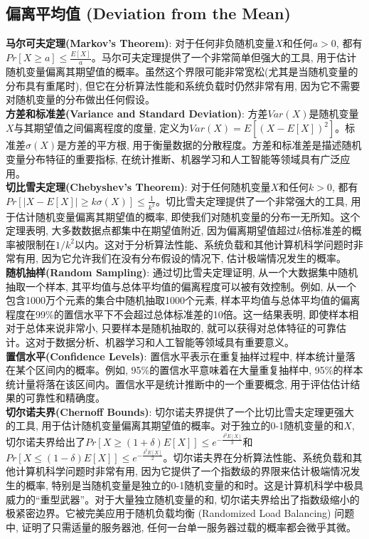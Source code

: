 \documentclass[12pt, a4paper, UTF8]{ctexart}
\newcommand{\term}[1]{\textbf{\textcolor{blue!80!black}{#1}}}
\begin{document}
\begin{sloppypar}
    \subsection{偏离平均值 (Deviation from the Mean)}
    \term{马尔可夫定理(Markov's Theorem)}: 对于任何非负随机变量$X$和任何$a > 0$, 都有$Pr[X \geq a] \leq \frac{E[X]}{a}$。马尔可夫定理提供了一个非常简单但强大的工具, 用于估计随机变量偏离其期望值的概率。虽然这个界限可能非常宽松(尤其是当随机变量的分布具有重尾时), 但它在分析算法性能和系统负载时仍然非常有用, 因为它不需要对随机变量的分布做出任何假设。\\
    \term{方差和标准差(Variance and Standard Deviation)}: 方差$Var(X)$是随机变量$X$与其期望值之间偏离程度的度量, 定义为$Var(X) = E[(X - E[X])^2]$。标准差$\sigma(X)$是方差的平方根, 用于衡量数据的分散程度。方差和标准差是描述随机变量分布特征的重要指标, 在统计推断、机器学习和人工智能等领域具有广泛应用。\\
    \term{切比雪夫定理(Chebyshev's Theorem)}: 对于任何随机变量$X$和任何$k > 0$, 都有$Pr[|X - E[X]| \geq k\sigma(X)] \leq \frac{1}{k^2}$。切比雪夫定理提供了一个非常强大的工具, 用于估计随机变量偏离其期望值的概率, 即使我们对随机变量的分布一无所知。这个定理表明, 大多数数据点都集中在期望值附近, 因为偏离期望值超过$k$倍标准差的概率被限制在$1/k^2$以内。这对于分析算法性能、系统负载和其他计算机科学问题时非常有用, 因为它允许我们在没有分布假设的情况下, 估计极端情况发生的概率。\\
    \term{随机抽样(Random Sampling)}: 通过切比雪夫定理证明, 从一个大数据集中随机抽取一个样本, 其平均值与总体平均值的偏离程度可以被有效控制。例如, 从一个包含1000万个元素的集合中随机抽取1000个元素, 样本平均值与总体平均值的偏离程度在99\%的置信水平下不会超过总体标准差的10倍。这一结果表明, 即使样本相对于总体来说非常小, 只要样本是随机抽取的, 就可以获得对总体特征的可靠估计。这对于数据分析、机器学习和人工智能等领域具有重要意义。\\
    \term{置信水平(Confidence Levels)}: 置信水平表示在重复抽样过程中, 样本统计量落在某个区间内的概率。例如, 95\%的置信水平意味着在大量重复抽样中, 95\%的样本统计量将落在该区间内。置信水平是统计推断中的一个重要概念, 用于评估估计结果的可靠性和精确度。\\
    \term{切尔诺夫界(Chernoff Bounds)}: 切尔诺夫界提供了一个比切比雪夫定理更强大的工具, 用于估计随机变量偏离其期望值的概率。对于独立的0-1随机变量的和$X$, 切尔诺夫界给出了$Pr[X \geq (1+\delta)E[X]] \leq e^{-\frac{\delta^2 E[X]}{3}}$和$Pr[X \leq (1-\delta)E[X]] \leq e^{-\frac{\delta^2 E[X]}{2}}$。切尔诺夫界在分析算法性能、系统负载和其他计算机科学问题时非常有用, 因为它提供了一个指数级的界限来估计极端情况发生的概率, 特别是当随机变量是独立的0-1随机变量的和时。这是计算机科学中极具威力的“重型武器”。对于大量独立随机变量的和, 切尔诺夫界给出了指数级缩小的极紧密边界。它被完美应用于随机负载均衡 (Randomized Load Balancing) 问题中, 证明了只需适量的服务器池, 任何一台单一服务器过载的概率都会微乎其微。


\end{sloppypar}
\end{document}
